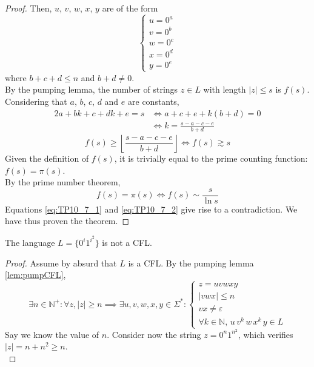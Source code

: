 \documentclass[docid=TP10]{tcom_TP}
\begin{document}
{\begin{proof}
Then, $u$, $v$, $w$, $x$, $y$ are of the form
\begin{equation*}
	\begin{cases}
		u=0^a\\
		v=0^b\\
		w=0^c\\
		x=0^d\\
		y=0^e
	\end{cases}
\end{equation*}
where $b+c+d \leq n$ and $b+d \neq 0$.\\
By the pumping lemma, the number of strings $z\in L$ with length $|z|\leq s$ is $f(s)$.
Considering that $a$, $b$, $c$, $d$ and $e$ are constants,
\begin{alignat*}{2}
	a+bk+c+dk+e=s
	&\iff a+c+e+k(b+d)=0\\
	&\iff k           =\frac{s-a-c-e}{b+d}
\end{alignat*}
\begin{equation} \label{eq:TP10_7_1}
	f(s) \geq \left\lfloor \frac{s-a-c-e}{b+d} \right\rfloor \iff f(s) \gtrsim s
\end{equation}
Given the definition of $f(s)$, it is trivially equal to the prime counting function: $f(s)=\pi(s)$.\\
By the prime number theorem,
\begin{equation} \label{eq:TP10_7_2}
	f(s) = \pi(s) \iff f(s) \sim \frac{s}{\ln{s}}
\end{equation}
Equations \eqref{eq:TP10_7_1} and \eqref{eq:TP10_7_2} give rise to a contradiction. We have thus proven the theorem.
\end{proof}
\pagebreak
{}
\begin{theorem}
The language $L=\{0^i1^{i^2}\}$ is not a CFL.
\end{theorem}
\begin{proof}
Assume by absurd that $L$ is a CFL. By the pumping lemma \eqref{lem:pumpCFL},
\begin{equation*}
	\exists n \in \mathbb{N}^+ \colon \forall z, |z|\geq n \implies \exists u, v, w, x, y \in \Sigma^* \colon 
	\begin{cases}
		z=uvwxy\\
		|vwx| \leq n\\
		vx \neq \varepsilon \\
		\forall k \in \mathbb{N},\,u\,v^k\,w\,x^k\,y \in L
	\end{cases}
\end{equation*}
Say we know the value of $n$. Consider now the string $z=0^n1^{n^2}$, which verifies $|z|=n+n^2 \geq n$. \\

\end{proof}}
\end{document}
